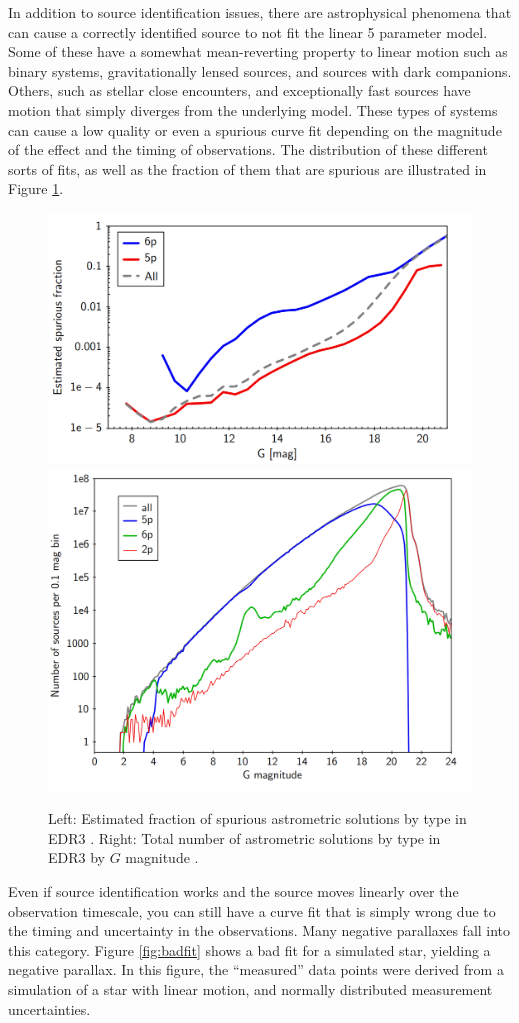 \documentclass[preprint2]{aastex631}
\begin{document}
In addition to source identification issues, there are astrophysical phenomena that can cause a correctly identified source to not fit the linear 5 parameter model. Some of these have a somewhat mean-reverting property to linear motion such as binary systems, gravitationally lensed sources, and sources with dark companions. Others, such as stellar close encounters, and exceptionally fast sources have motion that simply diverges from the underlying model. These types of systems can cause a low quality or even a spurious curve fit depending on the magnitude of the effect and the timing of observations. The distribution of these different sorts of fits, as well as the fraction of them that are spurious are illustrated in Figure \ref{fig:spuriousfraction}. 
\begin{figure}
	\includegraphics[width=0.56\columnwidth]{spuriousfraction.png}
	\includegraphics[width=0.42\columnwidth]{magdistEDR3.png}

	\caption{Left: Estimated fraction of spurious astrometric solutions by type in EDR3 \citep{fabriciusGaia2021}. Right: Total number of astrometric solutions by type in EDR3 by $G$ magnitude \citep{lindegrenGaia2021a}.}
	\label{fig:spuriousfraction}
\end{figure}

Even if source identification works and the source moves linearly over the observation timescale, you can still have a curve fit that is simply wrong due to the timing and uncertainty in the observations. Many negative parallaxes fall into this category. Figure \ref{fig:badfit} shows a bad fit for a simulated star, yielding a negative parallax. In this figure, the ``measured'' data points were derived from a simulation of a star with linear motion, and normally distributed measurement uncertainties.
\end{document}

